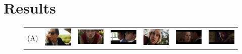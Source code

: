 
\section*{Results}
\begin{figure}[t!]
\begin{center}
\begin{tabular}{ccccccc}
\large{(A)}
& \includegraphics[width=0.12\linewidth]
  {fig/close-ups/01.jpg} 
& \includegraphics[width=0.12\linewidth]
  {fig/close-ups/02.jpg}  
& \includegraphics[width=0.12\linewidth]
  {fig/close-ups/10.jpg}   
& \includegraphics[width=0.12\linewidth]
  {fig/close-ups/15.jpg}
& \includegraphics[width=0.12\linewidth]
  {fig/close-ups/05.jpg} 
& \includegraphics[width=0.12\linewidth]
  {fig/close-ups/06.jpg}  
\\
\end{tabular}


\end{center}
\end{figure}
